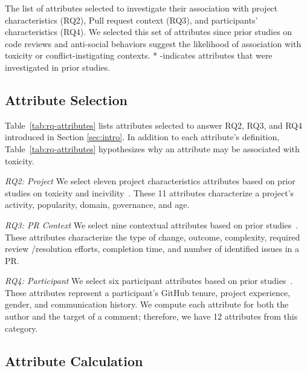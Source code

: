 \begin{table*}
    \caption{The list of attributes selected to investigate their association with project characteristics (RQ2), Pull request context (RQ3), and participants' characteristics (RQ4). We selected this set of attributes since prior studies on code reviews and anti-social behaviors suggest the likelihood of association with toxicity or conflict-instigating contexts. * -indicates attributes that were investigated in prior studies.}
    \label{tab:rq-attributes}
    \centering
    \vspace{-12pt}
    
\end{table*}


\subsection{Attribute Selection}
Table~\ref{tab:rq-attributes} lists attributes selected to answer RQ2, RQ3, and RQ4 introduced in Section \ref{sec:intro}. In addition to each attribute's definition, Table~\ref{tab:rq-attributes} hypothesizes why an attribute may be associated with toxicity.

\emph{RQ2: Project }
 We select eleven project characteristics attributes based on prior studies on toxicity and incivility~\cite{raman2020stress,miller2022did,ferreira2022heated,ferreira2021shut}. These 11 attributes characterize a project's activity, popularity, domain, governance, and age. 

\emph{RQ3: PR Context }
We select nine contextual attributes based on prior studies~\cite{miller2022did,thongtanunam2017review,raman2020stress,sultana2022code,egelman2020predicting,rahman2024words}. 
These attributes characterize the type of change, outcome, complexity, required review /resolution efforts, completion time, and number of identified issues in a PR.


 \emph{RQ4: Participant}
 We select six participant attributes based on prior studies~\cite{miller2022did,sultana2022identification,cohen2021contextualizing,murphy2022pushback,rahman2024words,ferreira2022heated}. These attributes represent a participant's GitHub tenure, project experience, gender, and communication history. We compute each attribute for both the author and the target of a comment; therefore, we have 12 attributes from this category. 

    
\subsection{Attribute Calculation}

